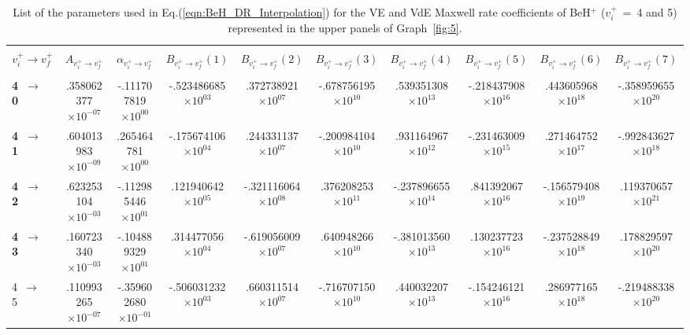 \documentclass[reviewcopy]{elsarticle}
\begin{document}
\begin{landscape}
\renewcommand{\thefootnote}{\fnsymbol{footnote}}
\renewcommand{\arraystretch}{0.81}
\scriptsize
\setlength\tabcolsep{1.2ex}
\begin{longtable}{lccccccccc}
\caption[table4]{List of the parameters used in Eq.(\ref{eqn:BeH_DR_Interpolation}) for the VE and VdE Maxwell rate coefficients of BeH$^+$  ($v^+_i$~=~4 and 5) represented in the upper panels of Graph~\ref{fig:5}.}\label{tab:BeH_VE_Interpolation4-5}\vspace{0.5cm}\\
\hline \\[-2ex]
   \multicolumn{1}{c}{$v^+_i \to v^+_f$} &
   \multicolumn{1}{c}{$A_{{v^+_i}\to {v^+_f}}$} &
   \multicolumn{1}{c}{$\alpha_{{v^+_i}\to {v^+_f}}$} &
   \multicolumn{1}{c}{$B_{{v^+_i}\to {v^+_f}}(1)$} &
   \multicolumn{1}{c}{$B_{{v^+_i}\to {v^+_f}}(2)$} &
   \multicolumn{1}{c}{$B_{{v^+_i}\to {v^+_f}}(3)$} &
   \multicolumn{1}{c}{$B_{{v^+_i}\to {v^+_f}}(4)$}  &
   \multicolumn{1}{c}{$B_{{v^+_i}\to {v^+_f}}(5)$} &
   \multicolumn{1}{c}{$B_{{v^+_i}\to {v^+_f}}(6)$} &
   \multicolumn{1}{c}{$B_{{v^+_i}\to {v^+_f}}(7)$} \\[5pt]
 \hline \\[-2ex]
\endhead
{\bf 4~$\to$~ 0}  &   .358062377$\times10^{-07}$ & -.111707819$\times10^{00}$ & -.523486685$\times10^{03}$ &  .372738921$\times10^{07}$ & -.678756195$\times10^{10}$ &  .539351308$\times10^{13}$ & -.218437908$\times10^{16}$ &  .443605968$\times10^{18}$ & -.358959655$\times10^{20}$ \\
{\bf 4~$\to$~ 1}  &   .604013983$\times10^{-09}$ &  .265464781$\times10^{00}$ & -.175674106$\times10^{04}$ &  .244331137$\times10^{07}$ & -.200984104$\times10^{10}$ &  .931164967$\times10^{12}$ & -.231463009$\times10^{15}$ &  .271464752$\times10^{17}$ & -.992843627$\times10^{18}$ \\
{\bf 4~$\to$~ 2}  &   .623253104$\times10^{-03}$ & -.112985446$\times10^{01}$ &  .121940642$\times10^{05}$ & -.321116064$\times10^{08}$ &  .376208253$\times10^{11}$ & -.237896655$\times10^{14}$ &  .841392067$\times10^{16}$ & -.156579408$\times10^{19}$ &  .119370657$\times10^{21}$ \\
{\bf 4~$\to$~ 3}  &   .160723340$\times10^{-03}$ & -.104889329$\times10^{01}$ &  .314477056$\times10^{04}$ & -.619056009$\times10^{07}$ &  .640948266$\times10^{10}$ & -.381013560$\times10^{13}$ &  .130237723$\times10^{16}$ & -.237528849$\times10^{18}$ &  .178829597$\times10^{20}$ \\
 4~$\to$~ 5  &   .110993265$\times10^{-07}$ & -.359602680$\times10^{-01}$ & -.506031232$\times10^{03}$ &  .660311514$\times10^{07}$ & -.716707150$\times10^{10}$ &  .440032207$\times10^{13}$ & -.154246121$\times10^{16}$ &  .286977165$\times10^{18}$ & -.219488338$\times10^{20}$ \\

\end{longtable}
\end{landscape}
\end{document}
